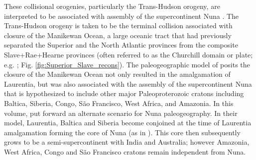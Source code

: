 \documentclass[twocolumn, switch]{article} %
\begin{document}
These collisional orogenies, particularly the Trans-Hudson orogeny, are interpreted to be associated with assembly of the supercontinent Nuna \citep{Zhang2012a,Pehrsson2015a}. The Trans-Hudson orogeny is taken to be the terminal collision associated with closure of the Manikewan Ocean, a large oceanic tract that had previously separated the Superior and the North Atlantic provinces from the composite Slave+Rae+Hearne provinces (often referred to as the Churchill domain or plate; e.g. \citealp{Skipton2016a, Weller2017a}; Fig. \ref{fig:Superior_Slave_recons}). The paleogeographic model of \cite{Pehrsson2015a} posits the closure of the Manikewan Ocean not only resulted in the amalgamation of Laurentia, but was also associated with the assembly of the supercontinent Nuna that is hypothesized to include other major Paleoproterozoic cratons including Baltica, Siberia, Congo, S\~ao Francisco, West Africa, and Amazonia. In this volume, \cite{Elming2021a} put forward an alternate scenario for Nuna paleogeography. In their model,  Laurentia, Baltica and Siberia become conjoined at the time of Laurentia amalgamation forming the core of Nuna (as in \citealp{Evans2011a}). This core then subsequently grows to be a semi-supercontinent with India and Australia; however Amazonia, West Africa, Congo and S\~ao Francisco cratons remain independent from Nuna.
\end{document}
